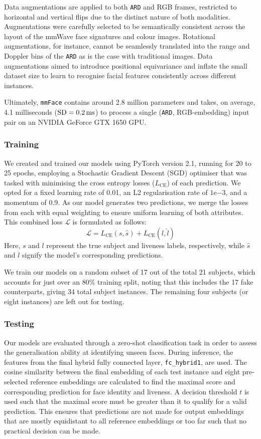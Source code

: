 \documentclass{mpaper}
\begin{document}
Data augmentations are applied to both \texttt{ARD} and RGB frames, restricted to horizontal and vertical flips due to the distinct nature of both modalities. Augmentations were carefully selected to be semantically consistent across the layout of the mmWave face signatures and colour images. Rotational augmentations, for instance, cannot be seamlessly translated into the range and Doppler bins of the \texttt{ARD} as is the case with traditional images. Data augmentations aimed to introduce positional equivariance and inflate the small dataset size to learn to recognise facial features consistently across different instances.

Ultimately, \texttt{mmFace} contains around 2.8 million parameters and takes, on average, 4.1 milliseconds ($\text{SD}=\text{\qty{0.2}{\ms}}$) to process a single (\texttt{ARD}, RGB-embedding) input pair on an NVIDIA GeForce GTX 1650 GPU.

\subsubsection{Training}
We created and trained our models using PyTorch version 2.1, running for 20 to 25 epochs, employing a Stochastic Gradient Descent (SGD) optimiser that was tasked with minimising the cross entropy losses ($L_{\text{CE}}$) of each prediction. We opted for a fixed learning rate of 0.01, an L2 regularisation rate of $1\mathrm{e}{-3}$, and a momentum of 0.9. As our model generates two predictions, we merge the losses from each with equal weighting to ensure uniform learning of both attributes. This combined loss $\mathcal{L}$ is formulated as follows:
$$\mathcal{L} = L_{\text{CE}}(s, \hat{s}) + L_{\text{CE}}(l, \hat{l})$$
Here, $s$ and $l$ represent the true subject and liveness labels, respectively, while $\hat{s}$ and $\hat{l}$ signify the model's corresponding predictions. 

We train our models on a random subset of 17 out of the total 21 subjects, which accounts for just over an 80\% training split, noting that this includes the 17 fake counterparts, giving 34 total subject instances. The remaining four subjects (or eight instances) are left out for testing.

\subsubsection{Testing}
Our models are evaluated through a zero-shot classification task in order to assess the generalisation ability at identifying unseen faces. During inference, the features from the final hybrid fully connected layer, \texttt{fc\_hybrid1}, are used. The cosine similarity between the final embedding of each test instance and eight pre-selected reference embeddings are calculated to find the maximal score and corresponding prediction for face identity and liveness. A decision threshold $t$ is used such that the maximal score must be greater than it to qualify for a valid prediction. This ensures that predictions are not made for output embeddings that are mostly equidistant to all reference embeddings or too far such that no practical decision can be made.
\end{document}
